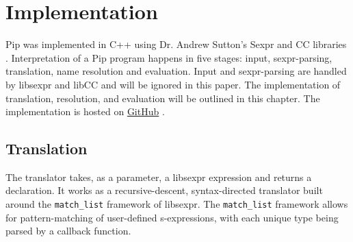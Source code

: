 \section{Implementation}

Pip was implemented in C++ using Dr. Andrew Sutton's Sexpr and CC libraries \cite{SuttonCC} \cite{SuttonSexpr}. Interpretation of a Pip program happens in five stages: input, sexpr-parsing, translation, name resolution and evaluation. Input and sexpr-parsing are handled by libsexpr and libCC and will be ignored in this paper. The implementation of translation, resolution, and evaluation will be outlined in this chapter. The implementation is hosted on \href{https://github.com/asutton/pip/}{GitHub} \cite{Pip}.

\subsection{Translation}
The translator takes, as a parameter, a libsexpr expression and returns a declaration. It works as a recursive-descent, syntax-directed translator built around the \texttt{match\_list} framework of libsexpr. The \texttt{match\_list} framework allows for pattern-matching of user-defined s-expressions, with each unique type being parsed by a callback function.

